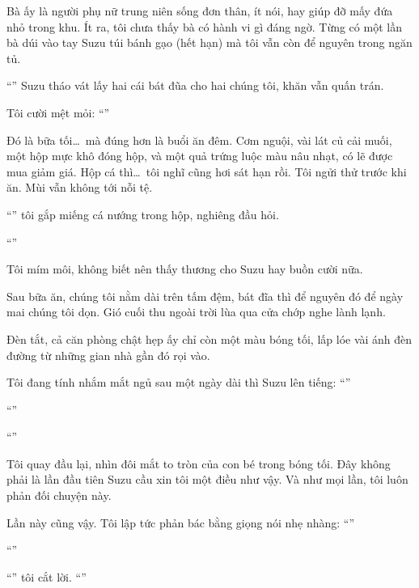 \documentclass[../main.tex]{subfiles}
\begin{document}
Bà ấy là người phụ nữ trung niên sống đơn thân, ít nói, hay giúp đỡ mấy đứa nhỏ trong khu. Ít ra, tôi chưa thấy bà có hành vi gì đáng ngờ. Từng có một lần bà dúi vào tay Suzu túi bánh gạo (hết hạn) mà tôi vẫn còn để nguyên trong ngăn tủ.

``'' Suzu tháo vát lấy hai cái bát đũa cho hai chúng tôi, khăn vẫn quấn trán.

Tôi cười mệt mỏi: ``''

Đó là bữa tối\dots\ mà đúng hơn là buổi ăn đêm. Cơm nguội, vài lát củ cải muối, một hộp mực khô đóng hộp, và một quả trứng luộc màu nâu nhạt, có lẽ được mua giảm giá. Hộp cá thì\dots\ tôi nghĩ cũng hơi sát hạn rồi. Tôi ngửi thử trước khi ăn. Mùi vẫn không tới nỗi tệ.

``'' tôi gắp miếng cá nướng trong hộp, nghiêng đầu hỏi.

``''

Tôi mím môi, không biết nên thấy thương cho Suzu hay buồn cười nữa.

\ct

Sau bữa ăn, chúng tôi nằm dài trên tấm đệm, bát đĩa thì để nguyên đó để ngày mai chúng tôi dọn. Gió cuối thu ngoài trời lùa qua cửa chớp nghe lành lạnh.

Đèn tắt, cả căn phòng chật hẹp ấy chỉ còn một màu bóng tối, lấp lóe vài ánh đèn đường từ những gian nhà gần đó rọi vào.

Tôi đang tính nhắm mắt ngủ sau một ngày dài thì Suzu lên tiếng: ``''

``''

``''

Tôi quay đầu lại, nhìn đôi mắt to tròn của con bé trong bóng tối. Đây không phải là lần đầu tiên Suzu cầu xin tôi một điều như vậy. Và như mọi lần, tôi luôn phản đối chuyện này.

Lần này cũng vậy. Tôi lập tức phản bác bằng giọng nói nhẹ nhàng: ``''

``''

``'' tôi cắt lời. ``''
\end{document}
